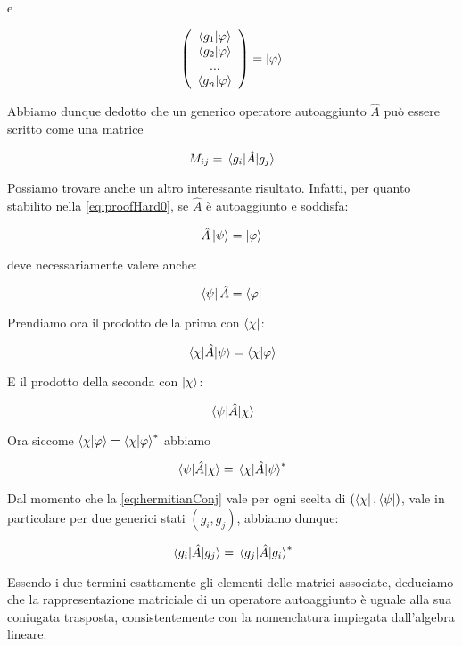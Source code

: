e

	\begin{equation}
		\left ( \begin{array}{c}
				\braket{g_1}{\varphi} \\
				\braket{g_2}{\varphi} \\
				... \\
				\braket{g_n}{\varphi} \\
			\end{array}
		\right ) = \ket{\varphi}
	\end{equation}

Abbiamo dunque dedotto che un generico operatore autoaggiunto $\hat{A}$ può essere scritto come una matrice

	\begin{equation} \label{eq:matricialFormOperator}
		M_{ij} = \mel{g_i}{\hat{A}}{g_j} 
	\end{equation}

	Possiamo trovare anche un altro interessante risultato. Infatti, per quanto stabilito nella \eqref{eq:proofHard0}, se $\hat{A}$ è autoaggiunto e soddisfa:
	
	\[
		\hat{A} \ket{\psi} = \ket{\varphi}
	\]
	
deve necessariamente valere anche:

	\[
		\bra{\psi} \hat{A} = \bra{\varphi}
	\]

Prendiamo ora il prodotto della prima con $\bra{\chi}$:

	\begin{equation}
		\mel{\chi}{\hat{A}}{\psi} = \braket{\chi}{\varphi}
	\end{equation}

E il prodotto della seconda con $\ket{\chi}$:

	\begin{equation}
		\mel{\psi}{\hat{A}}{\chi}
	\end{equation}

Ora siccome $\braket{\chi}{\varphi} = \braket{\chi}{\varphi}^*$ abbiamo

	\begin{equation} \label{eq:hermitianConj}
		\mel{\psi}{\hat{A}}{\chi} = \mel{\chi}{\hat{A}}{\psi}^*
	\end{equation}

	Dal momento che la \eqref{eq:hermitianConj} vale per ogni scelta di $(\bra{\chi}, \bra{\psi})$, vale in particolare per due generici stati $(g_i, g_j)$, abbiamo dunque:

	\begin{equation}
		\mel{g_i}{\hat{A}}{g_j} = \mel{g_j}{\hat{A}}{g_i}^*
	\end{equation}

Essendo i due termini esattamente gli elementi delle matrici associate, deduciamo che la rappresentazione matriciale di un operatore autoaggiunto è uguale alla sua coniugata trasposta, consistentemente con la nomenclatura impiegata dall'algebra lineare.
